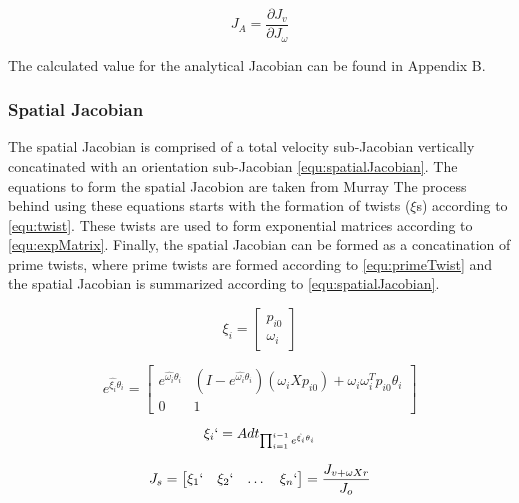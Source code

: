 \documentclass[10pt,journal]{IEEEtran}
\begin{document}
\begin{equation}\label{J_A}
J_A = \frac{\partial J_v}{\partial J_\omega}
\end{equation}

The calculated value for the analytical Jacobian can be found in Appendix B.

\subsubsection{Spatial Jacobian}
The spatial Jacobian is comprised of a total velocity sub-Jacobian vertically concatinated with an orientation sub-Jacobian \ref{equ:spatialJacobian}. The equations to form the spatial Jacobion are taken from Murray %
The process behind using these equations starts with the formation of twists ($\xi$s) according to \ref{equ:twist}. These twists are used to form exponential matrices according to \ref{equ:expMatrix}. Finally, the spatial Jacobian can be formed as a concatination of prime twists, where prime twists are formed according to \ref{equ:primeTwist} and the spatial Jacobian is summarized according to \ref{equ:spatialJacobian}.

\begin{equation}\label{equ:twist}
	\xi_i = \begin{bmatrix} p_{i0} \\ \omega_i \end{bmatrix}
\end{equation}

\begin{equation}\label{equ:expMatrix}
	e^{\hat{\xi_i} \theta_i} = \begin{bmatrix} e^{\hat{\omega_i} \theta_i} & (I - e^{\hat{\omega_i} \theta_i})(\omega_i X p_{i0})+\omega_i \omega_i^T p_{i0} \theta_i \\
	0 & 1
\end{bmatrix}
\end{equation}

\begin{equation}\label{equ:primeTwist}
	\xi_i`=Adt_{\prod_{i=1}^{i-1}e^{\hat{\xi_i}\theta_i}}
\end{equation}

\begin{equation}\label{equ:spatialJacobian}
	J_s = \begin{bmatrix} \xi_1` & \xi_2` & \dots & \xi_n` \end{bmatrix} = \frac{J_{v+\omega X r}}{J_o}
\end{equation}
\end{document}
